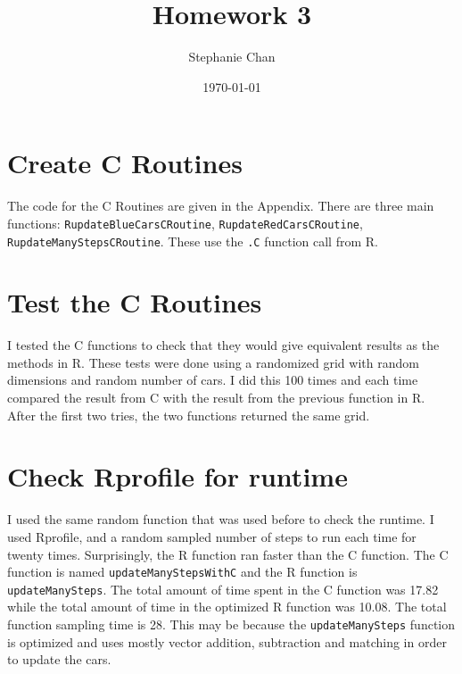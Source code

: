 \documentclass[11pt]{article}
\title{Homework 3}
\author{Stephanie Chan}
\date{\today}
\begin{document}
\maketitle

\setcounter{tocdepth}{3}
\tableofcontents
\vspace*{1cm}


\section{Create C Routines}
\label{sec-1}

The code for the C Routines are given in the Appendix.  There are
three main functions: \verb~RupdateBlueCarsCRoutine~, \verb~RupdateRedCarsCRoutine~,
\verb~RupdateManyStepsCRoutine~.  These use the \verb~.C~ function call from R.
\section{Test the C Routines}
\label{sec-2}

I tested the C functions to check that they would give equivalent
results as the methods in R.  These tests were done using a randomized
grid with random dimensions and random number of cars.  I did this 100
times and each time compared the result from C with the result from
the previous function in R.  After the first two tries, the two
functions returned the same grid.
\section{Check Rprofile for runtime}
\label{sec-3}


I used the same random function that was used before to check the
runtime.  I used Rprofile, and a random sampled number of steps to run
each time for twenty times.  Surprisingly, the R function ran faster
than the C function.  The C function is named \verb~updateManyStepsWithC~
and the R function is \verb~updateManySteps~.  The total amount of time
spent in the C function was 17.82 while the total amount of time in
the optimized R function was 10.08.  The total function sampling time
is 28.  This may be because the \verb~updateManySteps~ function is
optimized and uses mostly vector addition, subtraction and matching in
order to update the cars.
\end{document}
